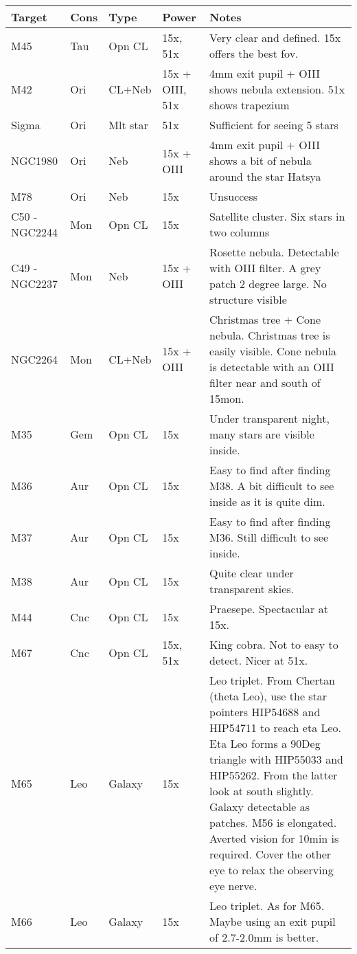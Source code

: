 \begin{longtable}{ p{0.7in}  p{0.3in}  p{0.6in}  p{0.9in}  p{5.8in} }
\hline 
{\bf Target} & {\bf Cons} & {\bf Type} & {\bf Power} & {\bf Notes} \\ 
\hline 
M45 & Tau & Opn CL & 15x, 51x & Very clear and defined. 15x offers the best fov. \\ 
M42 & Ori & CL+Neb & 15x + OIII, 51x & 4mm exit pupil + OIII shows nebula extension. 51x shows trapezium \\ 
Sigma & Ori & Mlt star & 51x & Sufficient for seeing 5 stars \\ 
NGC1980 & Ori & Neb & 15x + OIII & 4mm exit pupil + OIII shows a bit of nebula around the star Hatsya \\ 
M78 & Ori & Neb & 15x & Unsuccess \\ 
C50 - NGC2244 & Mon & Opn CL & 15x & Satellite cluster. Six stars in two columns  \\ 
C49 - NGC2237 & Mon & Neb & 15x + OIII & Rosette nebula. Detectable with OIII filter. A grey patch 2 degree large. No structure visible \\ 
NGC2264 & Mon & CL+Neb & 15x + OIII & Christmas tree + Cone nebula. Christmas tree is easily visible. Cone nebula is detectable with an OIII filter near and south of 15mon. \\ 
M35 & Gem & Opn CL & 15x & Under transparent night, many stars are visible inside. \\ 
M36 & Aur & Opn CL & 15x & Easy to find after finding M38. A bit difficult to see inside as it is quite dim. \\ 
M37 & Aur & Opn CL & 15x & Easy to find after finding M36. Still difficult to see inside. \\ 
M38 & Aur & Opn CL & 15x & Quite clear under transparent skies. \\ 
M44 & Cnc & Opn CL & 15x & Praesepe. Spectacular at 15x. \\ 
M67 & Cnc & Opn CL & 15x, 51x & King cobra. Not to easy to detect. Nicer at 51x. \\ 
M65 & Leo & Galaxy & 15x & Leo triplet. From Chertan (theta Leo), use the star pointers HIP54688 and HIP54711 to reach eta Leo. Eta Leo forms a 90Deg triangle with HIP55033 and HIP55262. From the latter look at south slightly. Galaxy detectable as patches. M56 is elongated. Averted vision for 10min is required. Cover the other eye to relax the observing eye nerve. \\ 
M66 & Leo & Galaxy & 15x & Leo triplet. As for M65. Maybe using an exit pupil of 2.7-2.0mm is better. \\ 

\end{longtable}
